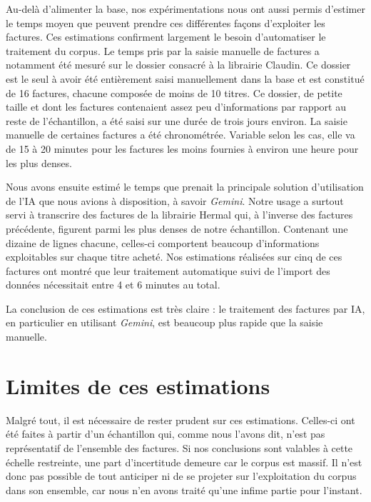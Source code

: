 Au-delà d'alimenter la base, nos expérimentations nous ont aussi permis d'estimer le temps moyen que peuvent prendre ces différentes façons d'exploiter les factures. Ces estimations confirment largement le besoin d'automatiser le traitement du corpus. Le temps pris par la saisie manuelle de factures a notamment été mesuré sur le dossier consacré à la librairie  Claudin. Ce dossier est le seul à avoir été entièrement saisi manuellement dans la base et est constitué de 16 factures, chacune composée de moins de 10 titres. Ce dossier, de petite taille et dont les factures contenaient assez peu d'informations par rapport au reste de l'échantillon, a été saisi sur une durée de trois jours environ. La saisie manuelle de certaines factures a été chronométrée. Variable selon les cas, elle va de 15 à 20 minutes pour les factures les moins fournies à environ une heure pour les plus denses. 

Nous avons ensuite estimé le temps que prenait la principale solution d'utilisation de l'IA que nous avions à disposition, à savoir \emph{Gemini}. Notre usage a surtout servi à transcrire des factures de la librairie Hermal qui, à l'inverse des factures précédente, figurent parmi les plus denses de notre échantillon. Contenant une dizaine de lignes chacune, celles-ci comportent beaucoup d'informations exploitables sur chaque titre acheté. Nos estimations réalisées sur cinq de ces factures ont montré que leur traitement automatique suivi de l'import des données nécessitait entre 4 et 6 minutes au total. 

La conclusion de ces estimations est très claire : le traitement des factures par IA, en particulier en utilisant \emph{Gemini}, est beaucoup plus rapide que la saisie manuelle. 

\section{Limites de ces estimations}

Malgré tout, il est nécessaire de rester prudent sur ces estimations. Celles-ci ont été faites à partir d'un échantillon qui, comme nous l'avons dit, n'est pas représentatif de l'ensemble des factures. Si nos conclusions sont valables à cette échelle  restreinte, une part d'incertitude demeure car le corpus est massif. Il n'est donc pas possible de tout anticiper ni de se projeter sur l'exploitation du corpus dans son ensemble, car nous n'en avons traité qu'une infime partie pour l'instant. 